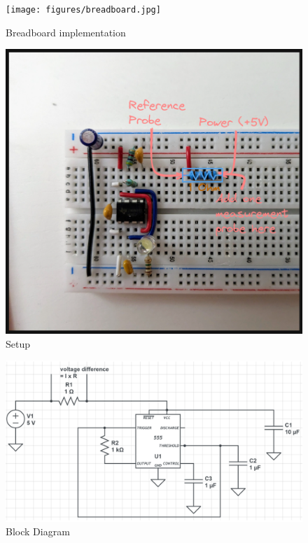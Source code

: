 \documentclass[a4paper,11pt]{article}%
\begin{document}
\begin{figure}[H]
	\centering
	\texttt{[image: figures/breadboard.jpg]}
	\caption{Breadboard implementation}
\end{figure}

\begin{figure}[H]
	\centering
	\includegraphics[scale=0.40]{figures/setup.png}
	\caption{Setup}
\end{figure}

\begin{figure}[H]
	\centering
	\includegraphics[scale=0.30]{figures/block_diagram.png}
	\caption{Block Diagram}
\end{figure}
\end{document}

